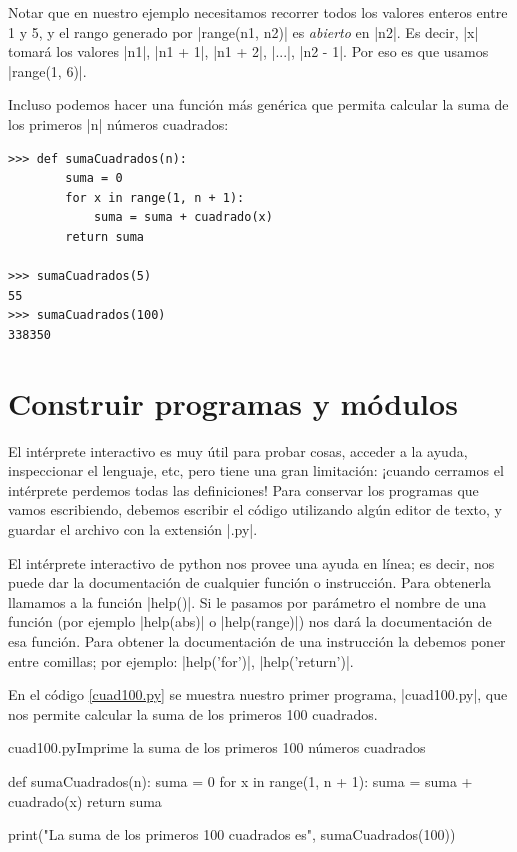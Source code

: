 Notar que en nuestro ejemplo necesitamos recorrer todos los valores enteros
entre 1 y 5, y el rango generado por |range(n1, n2)| es {\it abierto} en |n2|.
Es decir, |x| tomará los valores |n1|, |n1 + 1|, |n1 + 2|, |...|, |n2 - 1|.
Por eso es que usamos |range(1, 6)|.

Incluso podemos hacer una función más genérica que permita calcular la suma de
los primeros |n| números cuadrados:

\begin{lstlisting}[numbers=none]
>>> def sumaCuadrados(n):
        suma = 0
        for x in range(1, n + 1):
            suma = suma + cuadrado(x)
        return suma

>>> sumaCuadrados(5)
55
>>> sumaCuadrados(100)
338350
\end{lstlisting}

\section{Construir programas y módulos}

El intérprete interactivo es muy útil para probar cosas, acceder a la ayuda,
inspeccionar el lenguaje, etc, pero tiene una gran limitación: ¡cuando cerramos
el intérprete perdemos todas las definiciones! Para conservar los programas que
vamos escribiendo, debemos escribir el código utilizando algún editor de texto,
y guardar el archivo con la extensión |.py|.

\begin{sabias_que}
El intérprete interactivo de python nos provee una ayuda en línea; es decir,
nos puede dar la documentación de cualquier función o instrucción. Para
obtenerla llamamos a la función |help()|. Si le pasamos por parámetro el nombre
de una función (por ejemplo |help(abs)| o |help(range)|) nos dará la
documentación de esa función. Para obtener la documentación de una instrucción
la debemos poner entre comillas; por ejemplo: |help('for')|, |help('return')|.
\end{sabias_que}

En el código \ref{cuad100.py} se muestra nuestro primer programa, |cuad100.py|,
que nos permite calcular la suma de los primeros 100 cuadrados.

\begin{codigo}{cuad100.py}{Imprime la suma de los primeros 100 números
    cuadrados}
\label{cuad100.py}
\begin{codigo-python}
def sumaCuadrados(n):
    suma = 0
    for x in range(1, n + 1):
        suma = suma + cuadrado(x)
    return suma

print("La suma de los primeros 100 cuadrados es", sumaCuadrados(100))
\end{codigo-python}
\end{codigo}

